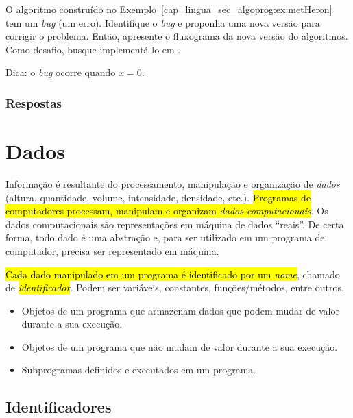 \begin{exer}\label{cap_lingua_sec_algoprog:exer:bugHeron}
  O algoritmo construído no Exemplo~\ref{cap_lingua_sec_algoprog:ex:metHeron} tem um \textit{bug} (um erro). Identifique o \textit{bug} e proponha uma nova versão para corrigir o problema. Então, apresente o fluxograma da nova versão do algoritmos. Como desafio, busque implementá-lo em {\python}. 
\end{exer}
\begin{resp}
  Dica: o \textit{bug} ocorre quando $x = 0$.
\end{resp}

\ifisbook
\subsubsection{Respostas}
\shipoutAnswer
\fi

\section{Dados}\label{cap_lingua_sec_dados}

Informação é resultante do processamento, manipulação e organização de \emph{dados} (altura, quantidade, volume, intensidade, densidade, etc.). \hl{Programas de computadores processam, manipulam e organizam \emph{dados computacionais}}. Os dados computacionais são representações em máquina de dados ``reais''. De certa forma, todo dado é uma abstração e, para ser utilizado em um programa de computador, precisa ser representado em máquina.

\hl{Cada dado manipulado em um programa é identificado por um \emph{nome}}, chamado de \hl{\emph{identificador}}. Podem ser variáveis, constantes, funções/métodos, entre outros.
\begin{itemize}
\item {}

  Objetos de um programa que armazenam dados que podem mudar de valor durante a sua execução.

\item {}

  Objetos de um programa que não mudam de valor durante a sua execução.

\item {}

  Subprogramas definidos e executados em um programa.
\end{itemize}

\subsection{Identificadores}

